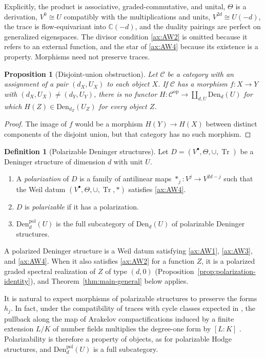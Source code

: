 \documentclass[11pt]{amsart}
\theoremstyle{plain}
\newtheorem{proposition}[theorem]{Proposition}
\theoremstyle{definition}
\newtheorem{definition}[theorem]{Definition}
\theoremstyle{remark}
\numberwithin{equation}{section}
\newcommand{\C}{\mathbb{C}}
\newcommand{\Den}{\mathrm{Den}}
\DeclareMathOperator{\Tr}{Tr}
\begin{document}
Explicitly, the product is associative, graded-commutative, and
unital, $\Theta$ is a derivation, $V^0\cong U$ compatibly with the
multiplications and units, $V^{2d}\cong U(-d)$, the trace is
flow-equivariant into $\C(-d)$, and the duality pairings are perfect
on generalized eigenspaces. The divisor condition \ref{ax:AW2} is
omitted because it refers to an external function, and the star of
\ref{ax:AW4} because its existence is a property. Morphisms need not
preserve traces.

\begin{proposition}[Disjoint-union obstruction]
\label{prop:den-disjoint-obstruction}
Let $\mathcal C$ be a category with an assignment of a pair
$(d_X,U_X)$ to each object $X$. If $\mathcal C$ has a morphism
$f:X\to Y$ with $(d_X,U_X)\ne(d_Y,U_Y)$, there is no functor
$H:\mathcal C^{\mathrm{op}}\to\coprod_{d,U}\Den_d(U)$ for which
$H(Z)\in\Den_{d_Z}(U_Z)$ for every object $Z$.
\end{proposition}

\begin{proof}
The image of $f$ would be a morphism $H(Y)\to H(X)$ between distinct
components of the disjoint union, but that category has no such
morphism.
\end{proof}

\begin{definition}[Polarizable Deninger structures]
\label{def:polarizable}
Let $D=(V^\bullet,\Theta,\cup,\Tr)$ be a Deninger structure of
dimension $d$ with unit $U$.
\begin{enumerate}[label=(\alph*)]
\item A \emph{polarization} of $D$ is a family of antilinear maps
  $*_j:V^j\to V^{2d-j}$ such that the Weil datum
  $(V^\bullet,\Theta,\cup,\Tr,*)$ satisfies \ref{ax:AW4}.
\item $D$ is \emph{polarizable} if it has a polarization.
\item $\Den^{\mathrm{pol}}_d(U)$ is the full subcategory of
  $\Den_d(U)$ of polarizable Deninger structures.
\end{enumerate}
\end{definition}

A polarized Deninger structure is a Weil datum satisfying
\ref{ax:AW1}, \ref{ax:AW3}, and \ref{ax:AW4}. When it also satisfies
\ref{ax:AW2} for a function $Z$, it is a polarized graded spectral
realization of $Z$ of type $(d,0)$
(Proposition~\ref{prop:polarization-identity}), and
Theorem~\ref{thm:main-general} below applies.

It is natural to expect morphisms of polarizable structures to
preserve the forms $h_j$. In fact, under the compatibility of traces
with cycle classes expected in
\cite[(2)--(5), pp.~4--5]{Deninger2025BSDDedekind}, the pullback along
the map of Arakelov compactifications induced by a finite extension
$L/K$ of number fields multiplies the degree-one form by $[L:K]$
\cite[(8), p.~5]{Deninger2025BSDDedekind}. Polarizability is therefore
a property of objects, as for polarizable Hodge structures, and
$\Den^{\mathrm{pol}}_d(U)$ is a full subcategory.
\end{document}

